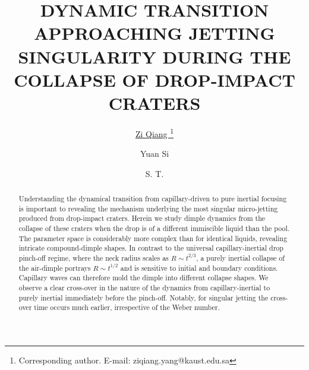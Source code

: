 \documentclass[10pt, a4paper]{article}
\begin{document}
\title{DYNAMIC TRANSITION APPROACHING JETTING SINGULARITY DURING THE COLLAPSE OF DROP-IMPACT CRATERS}

\author[1]{\underline{Zi Qiang } {\footnote{Corresponding author. E-mail: ziqiang.yang@kaust.edu.sa }}}
\author[1]{{Yuan Si } } 
\author[1]{S. T.  }


\maketitle

\begin{abstract}
Understanding the dynamical transition from capillary-driven to pure inertial focusing is important to revealing the mechanism underlying the most singular micro-jetting produced from drop-impact craters.  
Herein we study dimple dynamics from the collapse of these craters when the drop is of a different immiscible liquid than the pool. 
The parameter space is considerably more complex than for identical liquids, revealing intricate compound-dimple shapes. 
In contrast to the universal capillary-inertial drop pinch-off regime, where the neck radius scales as $R\sim t^{2/3}$, 
a purely inertial collapse of the air-dimple portrays $R \sim t^{1/2}$ and is sensitive to initial and boundary conditions. 
Capillary waves can therefore mold the dimple into different collapse shapes. 
We observe a clear cross-over in the nature of the dynamics from capillary-inertial to purely inertial immediately before the pinch-off.  
Notably, for singular jetting the cross-over time occurs much earlier, irrespective of the Weber number.
\end{abstract}
\end{document}

